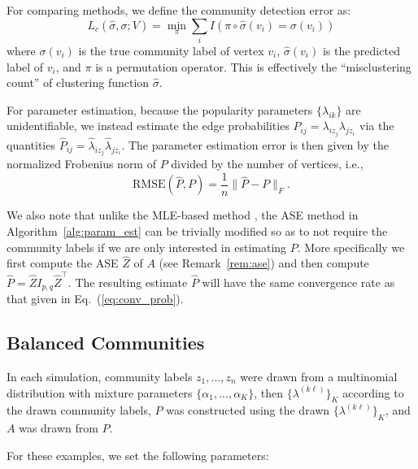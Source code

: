 \documentclass[12pt]{article}
\begin{document}
For comparing methods, we define the community detection error as:
\[L_c(\hat{\sigma}, \sigma; V) =
\min_\pi \sum_i I(\pi \circ \hat{\sigma}(v_i) = \sigma(v_i))\]
where \(\sigma(v_i)\) is the true community label of vertex \(v_i\),
\(\hat{\sigma}(v_i)\) is the predicted label of \(v_i\), and \(\pi\) is
a permutation operator. This is effectively the ``misclustering count''
of clustering function \(\hat{\sigma}\).

For parameter estimation, because the popularity parameters
$\{\lambda_{ik}\}$ are unidentifiable, we instead estimate the edge
probabilities $P_{ij} = \lambda_{i z_j} \lambda_{j z_i}$ via the
quantities $\hat{P}_{ij} = \hat{\lambda}_{iz_j} \hat{\lambda}_{jz_i}$. The
parameter estimation error is then given by the normalized 
Frobenius norm of $P$ divided by the number of vertices, i.e.,
$$\mathrm{RMSE}(\hat{P}, P) = \frac{1}{n} \|\hat{P} - P\|_F.$$

We also note that unlike the MLE-based method
\citep{307cbeb9b1be48299388437423d94bf1}, the ASE method in
Algorithm~\ref{alg:param_est} can be trivially modified so as to not
require the community labels if we are only interested in 
estimating $P$. More specifically we first compute the ASE
$\hat{Z}$ of $A$ (see Remark~\ref{rem:ase}) and then compute $\hat{P}
= \hat{Z} I_{p,q} \hat{Z}^{\top}$. The resulting estimate $\hat{P}$
will have the same convergence rate as that given in Eq.~(\ref{eq:conv_prob}).

\hypertarget{balanced-communities}{%
\subsection{Balanced Communities}\label{balanced-communities}}

In each simulation, community labels \(z_1, ..., z_n\) were drawn from a
multinomial distribution with mixture parameters
\(\{\alpha_1, ..., \alpha_K\}\), then \(\{\lambda^{(k \ell)}\}_K\) according
to the drawn community labels, \(P\) was constructed using the drawn
\(\{\lambda^{(k \ell)}\}_K\), and \(A\) was drawn from \(P\).

For these examples, we set the following parameters:
\end{document}
